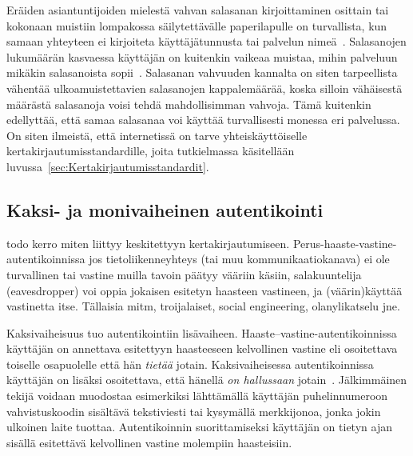 \documentclass[finnish,gradu]{tktltiki}
\begin{document}
  Eräiden asiantuntijoiden mielestä vahvan salasanan kirjoittaminen osittain tai kokonaan muistiin lompakossa säilytettävälle paperilapulle on turvallista, kun samaan yhteyteen ei kirjoiteta käyttäjätunnusta tai palvelun nimeä~\cite{fsecure_passwords_on_postit_09, microsoft_guru_write_your_password_05, schneier_changing_passwords_10, schneier_choosing_passwords_07, schneier_write_down_your_password_05}. Salasanojen lukumäärän kasvaessa käyttäjän on kuitenkin vaikeaa muistaa, mihin palveluun mikäkin salasanoista sopii~\cite{study_of_passwords_07}. Salasanan vahvuuden kannalta on siten tarpeellista vähentää ulkoamuistettavien salasanojen kappalemäärää, koska silloin vähäisestä määrästä salasanoja voisi tehdä mahdollisimman vahvoja. Tämä kuitenkin edellyttää, että samaa salasanaa voi käyttää turvallisesti monessa eri palvelussa. On siten ilmeistä, että internetissä on tarve yhteiskäyttöiselle kertakirjautumisstandardille, joita tutkielmassa käsitellään luvussa~\ref{sec:Kertakirjautumisstandardit}.



  \subsection{Kaksi- ja monivaiheinen autentikointi} %
  \label{sub:kaksivaiheinen_autentikointi}

  todo kerro miten liittyy keskitettyyn kertakirjautumiseen.
  Perus-haaste-vastine-autentikoinnissa jos tietoliikenneyhteys (tai muu kommunikaatiokanava) ei ole turvallinen tai vastine muilla tavoin päätyy vääriin käsiin, salakuuntelija (eavesdropper) voi oppia jokaisen esitetyn haasteen vastineen, ja (väärin)käyttää vastinetta itse.
  Tällaisia mitm, troijalaiset, social engineering, olanylikatselu jne.

  Kaksivaiheisuus tuo autentikointiin lisävaiheen. Haaste--vastine-autentikoinnissa käyttäjän on annettava esitettyyn haasteeseen kelvollinen vastine eli osoitettava toiselle osapuolelle että hän \emph{tietää} jotain. Kaksivaiheisessa autentikoinnissa käyttäjän on lisäksi osoitettava, että hänellä \emph{on hallussaan} jotain~\cite{NIST_SP800-63-1, google_2step_2010}. Jälkimmäinen tekijä voidaan muodostaa esimerkiksi lähttämällä käyttäjän puhelinnumeroon vahvistuskoodin sisältävä tekstiviesti tai kysymällä merkkijonoa, jonka jokin ulkoinen laite tuottaa. Autentikoinnin suorittamiseksi käyttäjän on tietyn ajan sisällä esitettävä kelvollinen vastine molempiin haasteisiin.
\end{document}
